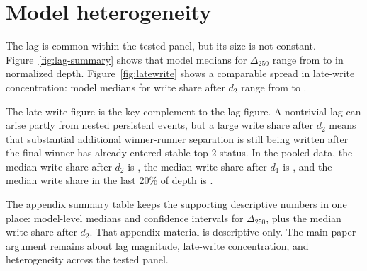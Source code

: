 \section{Model heterogeneity}

The lag is common within the tested panel, but its size is not constant. Figure~\ref{fig:lag-summary} shows that model medians for $\Delta_{250}$ range from \MinMedianDeltaTwoFifty{} to \MaxMedianDeltaTwoFifty{} in normalized depth. Figure~\ref{fig:latewrite} shows a comparable spread in late-write concentration: model medians for write share after $d_2$ range from \MinWriteAfterDTwo{} to \MaxWriteAfterDTwo{}.

The late-write figure is the key complement to the lag figure. A nontrivial lag can arise partly from nested persistent events, but a large write share after $d_2$ means that substantial additional winner-runner separation is still being written after the final winner has already entered stable top-2 status. In the pooled data, the median write share after $d_2$ is \PooledWriteAfterDTwo{}, the median write share after $d_1$ is \PooledWriteAfterDOne{}, and the median write share in the last 20\% of depth is \PooledWriteLastTwenty{}.

The appendix summary table keeps the supporting descriptive numbers in one place: model-level medians and confidence intervals for $\Delta_{250}$, plus the median write share after $d_2$. That appendix material is descriptive only. The main paper argument remains about lag magnitude, late-write concentration, and heterogeneity across the tested panel.
